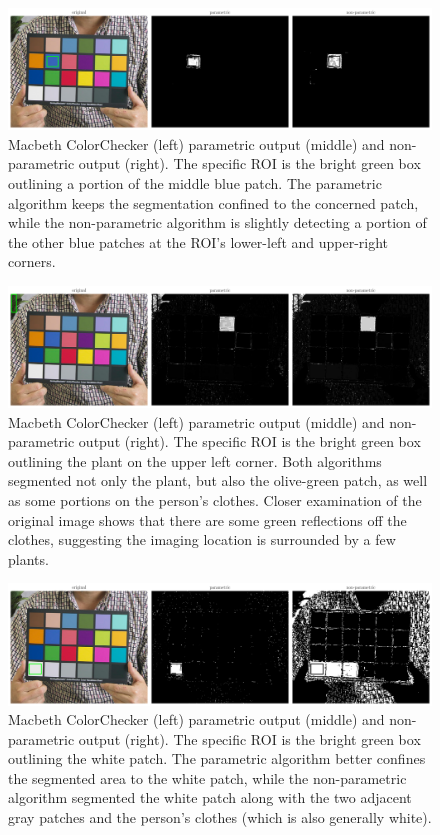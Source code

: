 \documentclass[12pt,a4paper]{article}
\begin{document}
\begin{figure}[htb]
	\centering
	\includegraphics[width=\textwidth]{mac_blue_out.png}
	\caption{Macbeth ColorChecker (left) parametric output (middle) and non-parametric output (right). The specific ROI is the bright green box outlining a portion of the middle blue patch. The parametric algorithm keeps the segmentation confined to the concerned patch, while the non-parametric algorithm is slightly detecting a portion of the other blue patches at the ROI's lower-left and upper-right corners.}
	\label{fig:macbeth-blue}
\end{figure}

\begin{figure}[htb]
	\centering
	\includegraphics[width=\textwidth]{mac_green_out.png}
	\caption{Macbeth ColorChecker (left) parametric output (middle) and non-parametric output (right). The specific ROI is the bright green box outlining the plant on the upper left corner. Both algorithms segmented not only the plant, but also the olive-green patch, as well as some portions on the person's clothes. Closer examination of the original image shows that there are some green reflections off the clothes, suggesting the imaging location is surrounded by a few plants.}
	\label{fig:macbeth-green}
\end{figure}

\begin{figure}[htb]
	\centering
	\includegraphics[width=\textwidth]{mac_white_out.png}
	\caption{Macbeth ColorChecker (left) parametric output (middle) and non-parametric output (right). The specific ROI is the bright green box outlining the white patch. The parametric algorithm better confines the segmented area to the white patch, while the non-parametric algorithm segmented the white patch along with the two adjacent gray patches and the person's clothes (which is also generally white).}
	\label{fig:macbeth-white}
\end{figure}
\end{document}
